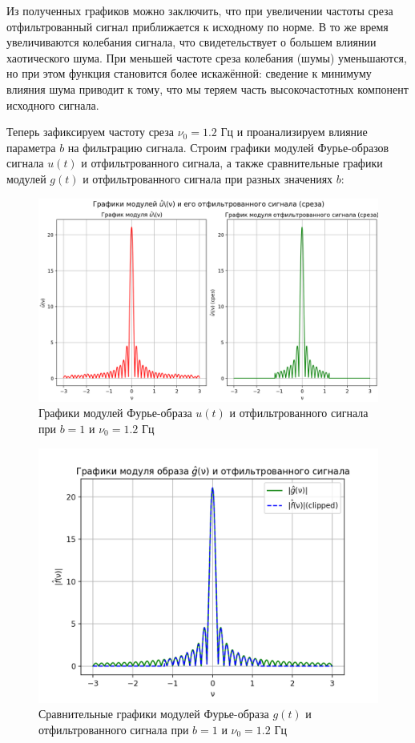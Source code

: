 Из полученных графиков можно заключить, что при увеличении частоты среза отфильтрованный сигнал приближается к исходному по норме. В то же время увеличиваются колебания сигнала, что свидетельствует о большем влиянии хаотического шума. При меньшей частоте среза колебания (шумы) уменьшаются, но при этом функция становится более искажённой: сведение к минимуму влияния шума приводит к тому, что мы теряем часть высокочастотных компонент исходного сигнала.

Теперь зафиксируем частоту среза $\nu_0=1.2$ Гц и проанализируем влияние параметра $b$ на фильтрацию сигнала. Строим графики модулей Фурье-образов сигнала $u(t)$ и отфильтрованного сигнала, а также сравнительные графики модулей $g(t)$ и отфильтрованного сигнала при разных значениях $b$:



\begin{figure}[ht!]
    \centering
    \includegraphics[scale=0.55]{media/1 task/high_freq/Fourier_Image_1_-1,1981981981981982.png}
    \caption{Графики модулей Фурье-образа $u (t)$ и отфильтрованного сигнала при $b=1$ и $\nu_0=1.2$ Гц}
    \label{fig:four_1_12}
\end{figure}

\begin{figure}[ht!]
    \centering
    \includegraphics[scale=0.55]{media/1 task/high_freq/Fourier_Image_Comparison_1_-1,1981981981981982.png}
    \caption{Сравнительные графики модулей Фурье-образа $g(t)$ и отфильтрованного сигнала при $b=1$ и $\nu_0=1.2$ Гц}
    \label{fig:fourc_1_12}
\end{figure}

